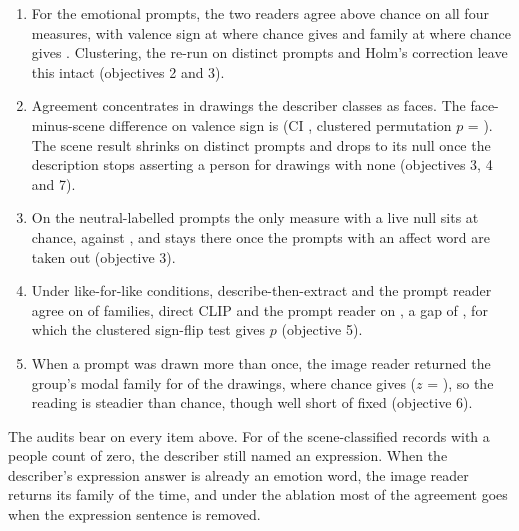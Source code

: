 \begin{enumerate}
\item For the \nEmotional{} emotional prompts, the two readers agree above chance on all four measures, with valence sign at \FullEmoSignObs{} where chance gives \FullEmoSignNull{} and family at \FullEmoFamObs{} where chance gives \FullEmoFamNull{}. Clustering, the re-run on distinct prompts and Holm's correction leave this intact (objectives 2 and 3).
\item Agreement concentrates in drawings the describer classes as faces. The face-minus-scene difference on valence sign is \DiffSignPp{} (CI \DiffSignCi{}, clustered permutation $p$ = \DiffSignP{}). The scene result shrinks on distinct prompts and drops to its null once the description stops asserting a person for drawings with none (objectives 3, 4 and 7).
\item On the neutral-labelled prompts the only measure with a live null sits at chance, \CtrlVaObs{} against \CtrlVaNull{}, and stays there once the \CtrlFlagged{} prompts with an affect word are taken out (objective 3).
\item Under like-for-like conditions, describe-then-extract and the prompt reader agree on \McDeFam{} of families, direct CLIP and the prompt reader on \McClipFam{}, a gap of \McDiffFamPp{}, for which the clustered sign-flip test gives $p$ \McClusterFamP{} (objective 5).
\item When a prompt was drawn more than once, the image reader returned the group's modal family for \ConsFam{} of the drawings, where chance gives \ConsFamNull{} ($z$ = \ConsFamZ{}), so the reading is steadier than chance, though well short of fixed (objective 6).
\end{enumerate}

The audits bear on every item above. For \DescScenePeopleZeroExpr{} of the \DescScenePeopleZero{} scene-classified records with a people count of zero, the describer still named an expression. When the describer's expression answer is already an emotion word, the image reader returns its family \DescCopyStrict{} of the time, and under the ablation most of the agreement goes when the expression sentence is removed.
